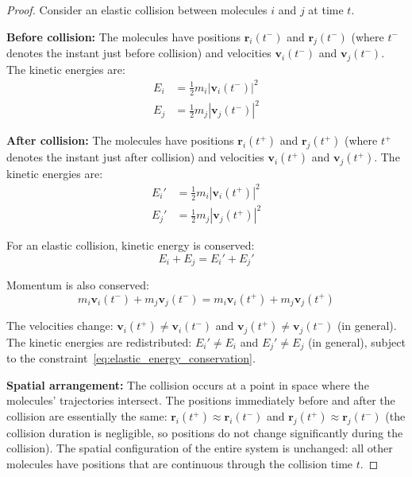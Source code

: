 \documentclass[12pt,a4paper]{article}
\theoremstyle{definition}
\theoremstyle{remark}
\begin{document}
\begin{proof}
Consider an elastic collision between molecules $i$ and $j$ at time $t$.

\textbf{Before collision:}
The molecules have positions $\mathbf{r}_i(t^-)$ and $\mathbf{r}_j(t^-)$ (where $t^-$ denotes the instant just before collision) and velocities $\mathbf{v}_i(t^-)$ and $\mathbf{v}_j(t^-)$. The kinetic energies are:
\begin{align}
E_i &= \frac{1}{2} m_i |\mathbf{v}_i(t^-)|^2 \\
E_j &= \frac{1}{2} m_j |\mathbf{v}_j(t^-)|^2
\end{align}

\textbf{After collision:}
The molecules have positions $\mathbf{r}_i(t^+)$ and $\mathbf{r}_j(t^+)$ (where $t^+$ denotes the instant just after collision) and velocities $\mathbf{v}_i(t^+)$ and $\mathbf{v}_j(t^+)$. The kinetic energies are:
\begin{align}
E_i' &= \frac{1}{2} m_i |\mathbf{v}_i(t^+)|^2 \\
E_j' &= \frac{1}{2} m_j |\mathbf{v}_j(t^+)|^2
\end{align}

For an elastic collision, kinetic energy is conserved:
\begin{equation}
E_i + E_j = E_i' + E_j'
\label{eq:elastic_energy_conservation}
\end{equation}

Momentum is also conserved:
\begin{equation}
m_i \mathbf{v}_i(t^-) + m_j \mathbf{v}_j(t^-) = m_i \mathbf{v}_i(t^+) + m_j \mathbf{v}_j(t^+)
\label{eq:elastic_momentum_conservation}
\end{equation}

The velocities change: $\mathbf{v}_i(t^+) \neq \mathbf{v}_i(t^-)$ and $\mathbf{v}_j(t^+) \neq \mathbf{v}_j(t^-)$ (in general). The kinetic energies are redistributed: $E_i' \neq E_i$ and $E_j' \neq E_j$ (in general), subject to the constraint~\eqref{eq:elastic_energy_conservation}.

\textbf{Spatial arrangement:}
The collision occurs at a point in space where the molecules' trajectories intersect. The positions immediately before and after the collision are essentially the same: $\mathbf{r}_i(t^+) \approx \mathbf{r}_i(t^-)$ and $\mathbf{r}_j(t^+) \approx \mathbf{r}_j(t^-)$ (the collision duration is negligible, so positions do not change significantly during the collision). The spatial configuration of the entire system is unchanged: all other molecules have positions that are continuous through the collision time $t$.


\end{proof}
\end{document}
